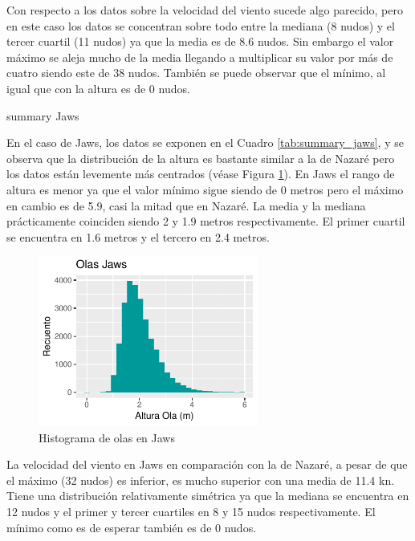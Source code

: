Con respecto a los datos sobre la velocidad del viento sucede algo parecido, pero en este caso los datos se concentran sobre todo entre la mediana (8 nudos) y el tercer cuartil (11 nudos) ya que la media es de 8.6 nudos. Sin embargo el valor máximo se aleja mucho de la media llegando a multiplicar su valor por más de cuatro siendo este de 38 nudos. También se puede observar que el mínimo, al igual que con la altura es de 0 nudos.


\begin{table}[htbp]
    \centering
    
    \caption{summary Jaws}
    \label{tab:summary_jaws}
\end{table}


En el caso de Jaws, los datos se exponen en el Cuadro \ref{tab:summary_jaws}, y se observa que la distribución de la altura es bastante similar a la de Nazaré pero los datos están levemente más centrados (véase Figura \ref{fig:hist_waves_jaws}). En Jaws el rango de altura es menor ya que el valor mínimo sigue siendo de 0 metros pero el máximo en cambio es de 5.9, casi la mitad que en Nazaré. La media y la mediana prácticamente coinciden siendo 2 y 1.9 metros respectivamente. El primer cuartil se encuentra en 1.6 metros y el tercero en 2.4 metros.

\begin{figure}[H]
    \centering
    \includegraphics[height=5.6cm]{./figures/jaws_hist_wave.pdf}
    \caption{Histograma de olas en Jaws}
    \label{fig:hist_waves_jaws}
\end{figure}

La velocidad del viento en Jaws en comparación con la de Nazaré, a pesar de que el máximo (32 nudos) es inferior, es mucho superior con una media de 11.4 \si{\knot}. Tiene una distribución relativamente simétrica ya que la mediana se encuentra en 12 nudos y el primer y tercer cuartiles en 8 y 15 nudos respectivamente. El mínimo como es de esperar también es de 0 nudos.

